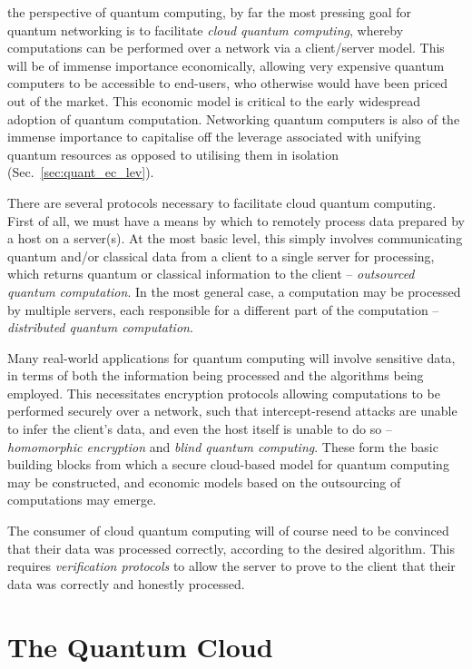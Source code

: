  the perspective of quantum computing, by far the most pressing goal for quantum networking is to facilitate \textit{cloud quantum computing}, whereby computations can be performed over a network via a client/server model. This will be of immense importance economically, allowing very expensive quantum computers to be accessible to end-users, who otherwise would have been priced out of the market. This economic model is critical to the early widespread adoption of quantum computation. Networking quantum computers is also of the immense importance to capitalise off the leverage associated with unifying quantum resources as opposed to utilising them in isolation (Sec.~\ref{sec:quant_ec_lev}).

There are several protocols necessary to facilitate cloud quantum computing. First of all, we must have a means by which to remotely process data prepared by a host on a server(s). At the most basic level, this simply involves communicating quantum and/or classical data from a client to a single server for processing, which returns quantum or classical information to the client -- \textit{outsourced quantum computation}. In the most general case, a computation may be processed by multiple servers, each responsible for a different part of the computation -- \textit{distributed quantum computation}.

Many real-world applications for quantum computing will involve sensitive data, in terms of both the information being processed and the algorithms being employed. This necessitates encryption protocols allowing computations to be performed securely over a network, such that intercept-resend attacks are unable to infer the client's data, and even the host itself is unable to do so -- \textit{homomorphic encryption} and \textit{blind quantum computing}. These form the basic building blocks from which a secure cloud-based model for quantum computing may be constructed, and economic models based on the outsourcing of computations may emerge.

The consumer of cloud quantum computing will of course need to be convinced that their data was processed correctly, according to the desired algorithm. This requires \textit{verification protocols} to allow the server to prove to the client that their data was correctly and honestly processed. 

%
%

\section{The Quantum Cloud\texttrademark} \label{sec:cloud} 

